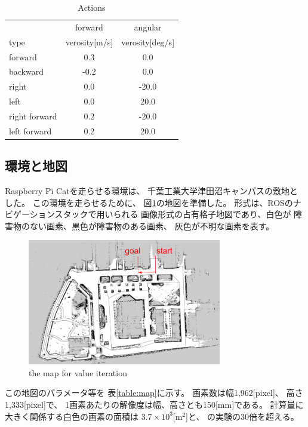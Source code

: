 \documentclass{jarticle}
\begin{document}
\begin{table}[hbtp]
	\caption{Actions}
	\label{table:actions}
	\centering
	\begin{small}
	\begin{tabular}{l|cc}
 		\hline
		& forward & angular \\
 		type & verosity[m/s] & verosity[deg/s] \\
 		\hline \hline
 		forward & 0.3 & 0.0 \\
 		backward & -0.2 & 0.0 \\
 		right & 0.0 & -20.0 \\
 		left & 0.0 & 20.0 \\
 		right forward & 0.2 & -20.0 \\
 		left forward & 0.2 & 20.0 \\
	 \hline
	\end{tabular}
	\end{small}
\end{table}


\subsection{環境と地図}

Raspberry Pi Catを走らせる環境は、
千葉工業大学津田沼キャンパスの敷地とした。
この環境を走らせるために、
図\ref{fig:tsudanuma}の地図を準備した。
形式は、ROSのナビゲーションスタックで用いられる
画像形式の占有格子地図であり、白色が
障害物のない画素、黒色が障害物のある画素、
灰色が不明な画素を表す。

\begin{figure}[htb]
  \centering
   \includegraphics[height=55mm]{./figs/tsudanuma.png}
   \caption{the map for value iteration}
	\label{fig:tsudanuma}
\end{figure}

この地図のパラメータ等を
表\ref{table:map}に示す。
画素数は幅1,962[pixel]、
高さ1,333[pixel]で、
1画素あたりの解像度は幅、高さとも150[mm]である。
計算量に大きく関係する白色の画素の面積は
$3.7\times 10^3$[m$^2$]と、\cite{上田rsj2021}
の実験の30倍を超える。
\end{document}
